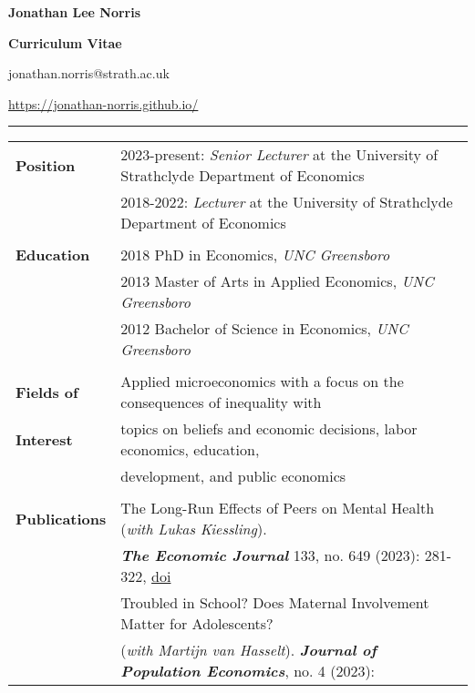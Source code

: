 \documentclass[11pt,a4paper]{article}
\begin{document}
	
\begin{center}

\textsf{{\Large\textbf{Jonathan Lee Norris}}}		
\smallskip	
	
\textsf{{\Large \textbf{Curriculum Vitae}}} 
\smallskip
	
\textsf{jonathan.norris@strath.ac.uk}

\textsf{\url{https://jonathan-norris.github.io/}}	
\end{center}	
	\hrule height 1pt

\bigskip

\begin{longtable}{l l}
\textbf{Position}          &  2023-present: \textit{Senior Lecturer} at the University of Strathclyde Department of Economics \\
																			 &  2018-2022: \textit{Lecturer} at the University of Strathclyde Department of Economics  \\
                                       &  \\
\textbf{Education}      &   2018 PhD in Economics, \textit{UNC Greensboro}	  \\
																			 &   2013 Master of Arts in Applied Economics, \textit{UNC Greensboro}    \\
																			 &   2012 Bachelor of Science in Economics, \textit{UNC Greensboro}	   \\
																			 &   \\ 
\textbf{Fields of}         &   Applied microeconomics with a focus on the consequences of inequality with    \\
\textbf{Interest}					 &   topics on beliefs and economic decisions, labor economics, education,     \\
                           &   development, and public economics \\       
																			 &   \\
\textbf{Publications}                   &  The Long-Run Effects of Peers on Mental Health (\textit{with Lukas Kiessling}).     \\
																				&  \textbf{\textit{The Economic Journal}} 133, no. 649 (2023): 281-322, \href{https://doi.org/10.1093/ej/ueac039}{doi}  \\ 
\addlinespace
																				&  Troubled in School? Does Maternal Involvement Matter for Adolescents?  \\
																				&  (\textit{with Martijn van Hasselt}). \textbf{\textit{Journal of Population Economics}}, no. 4 (2023): \\

\end{longtable}
\end{document}
